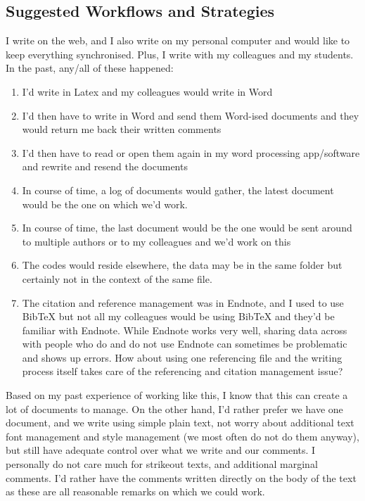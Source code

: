 \subsection{Suggested Workflows and Strategies}

I write on the web, and I also write on my personal computer and would like to keep everything synchronised. Plus, I write with my colleagues and my students. In the past, any/all of these happened:

\begin{enumerate}
\item I'd write in Latex and my colleagues would write in Word
\item I'd then have to write in Word and send them Word-ised documents and they would return me back their written comments
\item I'd then have to read or open them again in my word processing app/software and rewrite and resend the documents
\item In course of time, a log of documents would gather, the latest document would be the one on which we'd work.
\item In course of time, the last document would be the one would be sent around to multiple authors or to my colleagues and we'd work on this
\item The codes would reside elsewhere, the data may be in the same folder but certainly not in the context of the same file. 
\item The citation and reference management was in Endnote, and I used to use BibTeX but not all my colleagues would be using BibTeX and they'd be familiar with Endnote. While Endnote works very well, sharing data across with people who do and do not use Endnote can sometimes be problematic and shows up errors. How about using one referencing file and the writing process itself takes care of the referencing and citation management issue?
\end{enumerate}

Based on my past experience of working like this, I know that this can create a lot of documents to manage. On the other hand, I'd rather prefer we have one document, and we write using simple plain text, not worry about additional text font management and style management (we most often do not do them anyway), but still have adequate control over what we write and our comments. I personally do not care much for strikeout texts, and additional marginal comments. I'd rather have the comments written directly on the body of the text as these are all reasonable remarks on which we could work. 


